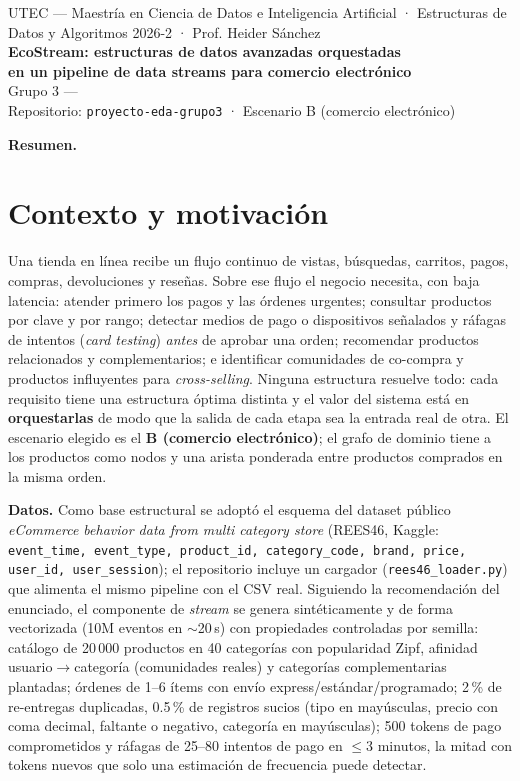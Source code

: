 \documentclass[10pt,a4paper]{article}
\begin{document}
\begin{center}
{\sffamily\small UTEC — Maestría en Ciencia de Datos e Inteligencia Artificial · Estructuras de Datos y Algoritmos 2026-2 · Prof. Heider Sánchez}\\[4pt]
{\LARGE\bfseries\sffamily EcoStream: estructuras de datos avanzadas orquestadas\\[2pt] en un pipeline de data streams para comercio electrónico}\\[5pt]
{\sffamily Grupo 3 — }\\[2pt]
{\small\sffamily Repositorio: \texttt{proyecto-eda-grupo3} · Escenario B (comercio electrónico)}
\end{center}

\noindent\colorbox{acc!8}{\parbox{\dimexpr\linewidth-2\fboxsep}{\small
\textbf{Resumen.} }}

\section{Contexto y motivación}
Una tienda en línea recibe un flujo continuo de vistas, búsquedas, carritos, pagos, compras, devoluciones y reseñas. Sobre ese flujo
el negocio necesita, con baja latencia: atender primero los pagos y las órdenes urgentes; consultar productos por clave y por rango;
detectar medios de pago o dispositivos señalados y ráfagas de intentos (\emph{card testing}) \emph{antes} de aprobar una orden;
recomendar productos relacionados y complementarios; e identificar comunidades de co-compra y productos influyentes para
\emph{cross-selling}. Ninguna estructura resuelve todo: cada requisito tiene una estructura óptima distinta y el valor del sistema
está en \textbf{orquestarlas} de modo que la salida de cada etapa sea la entrada real de otra. El escenario elegido es el
\textbf{B (comercio electrónico)}; el grafo de dominio tiene a los productos como nodos y una arista ponderada entre productos
comprados en la misma orden.

\textbf{Datos.} Como base estructural se adoptó el esquema del dataset público \emph{eCommerce behavior data from multi category store}
(REES46, Kaggle: \texttt{event\_time, event\_type, product\_id, category\_code, brand, price, user\_id, user\_session}); el repositorio incluye
un cargador (\texttt{rees46\_loader.py}) que alimenta el mismo pipeline con el CSV real. Siguiendo la recomendación del enunciado, el
componente de \emph{stream} se genera sintéticamente y de forma vectorizada (10M eventos en $\sim$20\,s) con propiedades controladas por semilla:
catálogo de 20\,000 productos en 40 categorías con popularidad Zipf, afinidad usuario$\to$categoría (comunidades reales) y categorías
complementarias plantadas; órdenes de 1–6 ítems con envío express/estándar/programado; 2\,\% de re-entregas duplicadas, 0.5\,\% de registros sucios
(tipo en mayúsculas, precio con coma decimal, faltante o negativo, categoría en mayúsculas); 500 tokens de pago comprometidos y ráfagas
de 25–80 intentos de pago en $\le$3 minutos, la mitad con tokens nuevos que solo una estimación de frecuencia puede detectar.
\end{document}
